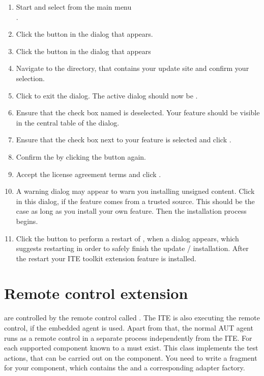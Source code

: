 \begin{enumerate}
\item Start \app{} and select from the main menu\\
.
\item Click the 
button in the  dialog that appears.
\item Click the  button in the  dialog
that appears
\item Navigate to the directory, that contains your update site and confirm your
selection.
\item Click  to exit the  dialog.
 The active dialog should now be .
\item Ensure that the check box named  is
deselected. Your feature should be visible in the central table of the dialog.
\item Ensure that the check box next to your feature is selected and click
 .
\item Confirm the  by clicking the 
 button again.
\item Accept the license agreement terms and click .
\item A warning dialog may appear to warn you installing unsigned content.
 Click  in this dialog, if the feature comes from a trusted
 source. This should be the case as long as you install your own feature.
 Then the installation process begins.
\item Click the  button to perform a restart of \app{},
 when a dialog appears, which suggests restarting \app{} in order to safely
 finish the update / installation.  After the restart your ITE toolkit extension
 feature is installed.
\end{enumerate}

\section{Remote control extension}
\label{remoteControlExtension}

\gdauts{} are controlled by the remote control called \gdagent. The ITE
is also executing the remote control, if the embedded agent is
used. Apart from that, the normal AUT agent runs as a remote control in a
separate process independently from the ITE.
For each supported component known to \app{} a \gdtesterclass must exist.
This class implements the test actions, that can be carried out on the component.
You need to write a fragment for your component, which contains the
\gdtesterclass and a corresponding adapter factory.


